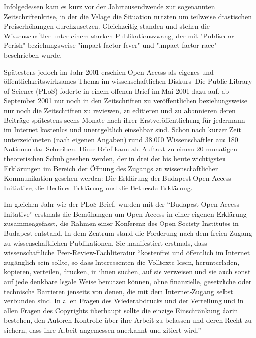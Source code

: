 Infolgedessen kam es kurz vor der Jahrtausendwende zur sogenannten Zeitschriftenkrise\cite{suchen}, in der die Velage die Situation nutzten um teilweise drastischen Preiserhöhungen durchzusetzen. Gleichzeitig standen und stehen die Wissenschaftler unter einem starken Publikationszwang, der mit "Publish or Perish"\cite{CLAPHAM_2005} beziehungsweise "impact factor fever"\cite{Cherubini_2008} und "impact factor race"\cite{Brischoux_2009} beschrieben wurde\cite{offhaus_2012_institutionelle_repos}.

Spätestens jedoch im Jahr 2001 erschien Open Access als eigenes und öffentlichkeitswirksames Thema im wissenschaftlichen Diskurs\cite{cite:19}. Die Public Library of Science (PLoS) foderte in einem offenen Brief im Mai 2001\cite{cite:20} dazu auf, ab September 2001 nur noch in den Zeitschriften zu veröffentlichen beziehungsweise nur noch die Zeitschriften zu reviewen, zu editieren und zu abonnieren deren Beiträge spätestens sechs Monate nach ihrer Erstveröffentlichung für jedermann im Internet kostenlos und unentgeltlich einsehbar sind. Schon nach kurzer Zeit unterzeichneten (nach eigenen Angaben\cite{cite:19a}) rund 38.000 Wissenschaftler aus 180 Nationen das Schreiben. Diese Brief kann als Auftakt zu einem 20-monatigen theoretischen Schub gesehen werden, der in drei der bis heute wichtigsten Erklärungen im Bereich der Öffnung des Zugangs zu wissenschaftlicher Kommunikation gesehen werden: Die Erklärung der Budapest Open Access Initiative, die Berliner Erklärung und die Bethesda Erklärung.\cite{CREATe_2014}

Im gleichen Jahr wie der PLoS-Brief, wurden mit der “Budapest Open Access Initative”\cite{boai_2012} erstmals die Bemühungen um Open Access in einer eigenen Erklärung zusammengefasst\cite{cite:21a}, die Rahmen einer Konferenz des Open Society Institutes in Budapest entstand. In dem Zentrum stand die Forderung nach dem freien Zugang zu wissenschaftlichen Publikationen. Sie manifestiert erstmals, dass wissenschaftliche Peer-Review-Fachliteratur “kostenfrei und öffentlich im Internet zugänglich sein sollte, so dass Interessenten die Volltexte lesen, herunterladen, kopieren, verteilen, drucken, in ihnen suchen, auf sie verweisen und sie auch sonst auf jede denkbare legale Weise benutzen können, ohne finanzielle, gesetzliche oder technische Barrieren jenseits von denen, die mit dem Internet-Zugang selbst verbunden sind. In allen Fragen des Wiederabdrucks und der Verteilung und in allen Fragen des Copyrights überhaupt sollte die einzige Einschränkung darin bestehen, den Autoren Kontrolle über ihre Arbeit zu belassen und deren Recht zu sichern, dass ihre Arbeit angemessen anerkannt und zitiert wird.”\cite{boai_2012} 


